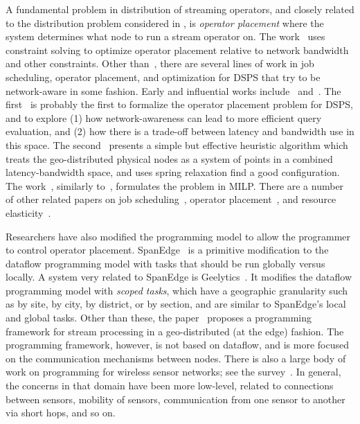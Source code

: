 A fundamental problem in distribution of streaming operators, and closely related to the distribution problem considered in ,
is \emph{operator placement} where the system determines what node to run a stream operator on.
The work~\cite{cardellini2016optimal} uses constraint solving to optimize operator placement relative to network bandwidth and other constraints.
Other than~\cite{cardellini2016optimal}, there are several lines of work in job scheduling, operator placement, and optimization for DSPS that try to be network-aware in some fashion. Early and influential works include~\cite{ahmad2004network} and~\cite{pietzuch2006network}.
The first~\cite{ahmad2004network} is probably the first to formalize the operator placement problem for DSPS, and to explore (1) how network-awareness can lead to more efficient query evaluation, and (2) how there is a trade-off between latency and bandwidth use in this space.
The second~\cite{pietzuch2006network} presents a simple but effective heuristic algorithm which treats the geo-distributed physical nodes as a system of points in a combined latency-bandwidth space, and uses spring relaxation find a good configuration.
The work~\cite{gu2015general}, similarly to~\cite{cardellini2016optimal}, formulates the problem in MILP.
There are a number of other related papers on job scheduling~\cite{aniello2013adaptive,xu2014tstorm,eidenbenz2016task,wolf2008soda,fu2019edgewise}, operator placement~\cite{bonfils2004adaptive,tziritas2016improving,rizou2010solving,lakshmanan2008placement},
and resource elasticity~\cite{cardellini2018decentralized,hochreiner2016elastic,cardellini2018optimal,dias2018dsp-survey}.

Researchers have also modified the programming model to allow the programmer to control operator placement.
SpanEdge~\cite{sajjad2016spanedge} is a primitive modification to the dataflow programming model with tasks that should be run globally versus locally.
A system very related to SpanEdge is Geelytics~\cite{cheng2015geelytics}.
It modifies the dataflow programming model with \emph{scoped tasks}, which have a geographic granularity such as by site, by city, by district, or by section, and are similar to SpanEdge's local and global tasks.
Other than these, the paper~\cite{renart2017datadrivenstreamedge} proposes a programming framework for stream processing in a geo-distributed (at the edge) fashion. The programming framework, however, is not based on dataflow, and is more focused on the communication mechanisms between nodes. There is also a large body of work on programming for wireless sensor networks; see the survey~\cite{mottola2011programming-wsn}. In general, the concerns in that domain have been more low-level, related to connections between sensors, mobility of sensors, communication from one sensor to another via short hops, and so on.

